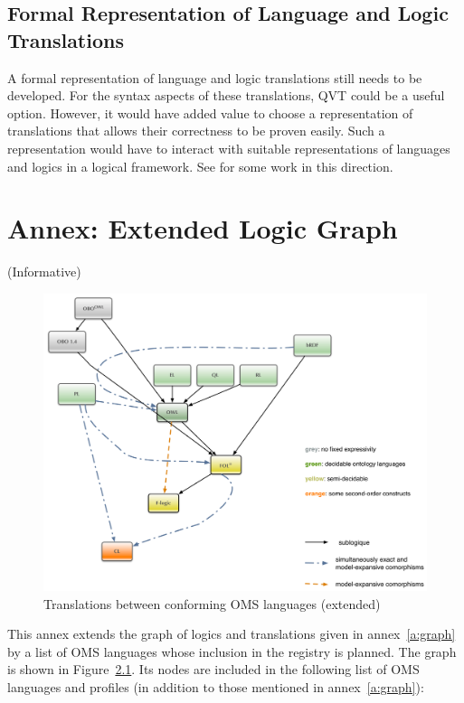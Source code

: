\documentclass[10pt,fleqn,final]{scrreprt}
\newcommand{\annexrefname}{annex}
\newcommand{\figurerefname}{Figure}
\newcommand{\aref}[1]{\annexrefname~\ref{#1}}
\newcommand{\fref}[1]{\figurerefname~\ref{#1}}
\newcommand{\informative}[0]{{\begin{center}{\Large{(Informative})}\end{center}} \bigskip}
\newcommand{\sclause}[1]{\section{#1}}
\newcommand{\infannex}[1]{ \chapter{Annex: #1}  \informative }
\begin{document}
\sclause{Formal Representation of Language and Logic Translations}
\label{sec:repr-trans}

A formal representation of language and logic translations still needs
to be developed. For the syntax aspects of these translations, QVT
could be a useful option. However, it would have added value to choose
a representation of translations that allows  their correctness
to be proven easily. Such a representation would have to interact
with suitable representations of languages and logics in a 
logical framework. See \cite{CodescuEtAl2011d} for some work
in this direction.


\infannex{Extended Logic Graph}\label{a:ext-graph}

\begin{figure}
  \centering
  \includegraphics[width=\textwidth]{illustrations/pre-reduced-ontograph}
  \caption{Translations between conforming OMS languages (extended)}
  \label{fig:pre-ontograph}
\end{figure}
This annex extends the graph of logics and translations given in
\aref{a:graph} by a list of OMS languages  whose inclusion in
the registry is planned.  The graph is shown in
\fref{fig:pre-ontograph}.  Its nodes are included in the following
list of OMS languages and profiles (in addition to those
mentioned in \aref{a:graph}):
\end{document}
